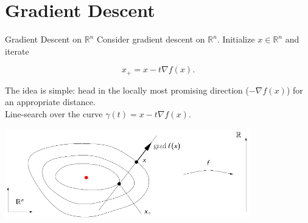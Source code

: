 \documentclass[xcolor=dvipsnames,t]{beamer} %
\newcommand{\reals}{\mathbb{R}}
\begin{document}


\section{Gradient Descent}
\begin{frame}{Gradient Descent on $\reals^n$}
   Consider gradient descent on $\reals^n$.  Initialize $x\in\reals^n$ and iterate

   \[ x_{+}=x - t\nabla f(x). \] 

   \noindent The idea is simple: head in the locally most promising direction ($-\nabla f(x)$) for an appropriate distance.\\[0.5em]

   \noindent Line-search over the curve $\gamma(t) = x - t\nabla f(x)$.


   \begin{center}
      \includegraphics[width=0.8\textwidth]{figures/GD_Rn.pdf}
   \end{center}

\end{frame}
\end{document}
